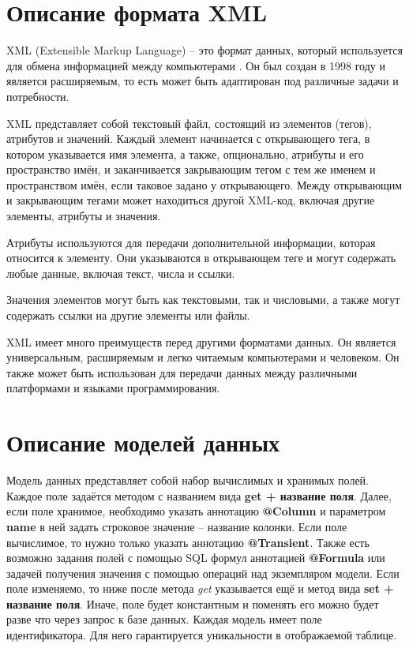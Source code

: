 \documentclass[a4paper,12pt]{diplom}
\begin{document}
\section{Описание формата XML}

XML (Extensible Markup Language) -- это формат данных, который используется для обмена информацией между компьютерами \cite{W3C:XML}. Он был создан в 1998 году и является расширяемым, то есть может быть адаптирован под различные задачи и потребности.

XML представляет собой текстовый файл, состоящий из элементов (тегов), атрибутов и значений. Каждый элемент начинается с открывающего тега, в котором указывается имя элемента, а также, опционально, атрибуты и его пространство имён, и заканчивается закрывающим тегом с тем же именем и пространством имён, если таковое задано у открывающего. Между открывающим и закрывающим тегами может находиться другой XML-код, включая другие элементы, атрибуты и значения.

Атрибуты используются для передачи дополнительной информации, которая относится к элементу. Они указываются в открывающем теге и могут содержать любые данные, включая текст, числа и ссылки.

Значения элементов могут быть как текстовыми, так и числовыми, а также могут содержать ссылки на другие элементы или файлы.

XML имеет много преимуществ перед другими форматами данных. Он является универсальным, расширяемым и легко читаемым компьютерами и человеком. Он также может быть использован для передачи данных между различными платформами и языками программирования.

\section{Описание моделей данных}

Модель данных представляет собой набор вычислимых и хранимых полей. Каждое поле задаётся методом с названием вида \textbf{get + название поля}. Далее, если поле хранимое, необходимо указать аннотацию \textbf{@Column} и параметром \textbf{name} в ней задать строковое значение -- название колонки. Если поле вычислимое, то нужно только указать аннотацию \textbf{@Transient}. Также есть возможно задания полей с помощью SQL формул аннотацией \textbf{@Formula} или задачей получения значения с помощью операций над экземпляром модели.  Если поле изменяемо, то ниже после метода \textit{get} указывается ещё и метод вида \textbf{set + название поля}. Иначе, поле будет константным и поменять его можно будет разве что через запрос к базе данных. Каждая модель имеет поле идентификатора. Для него гарантируется уникальности в отображаемой таблице.
\end{document}
